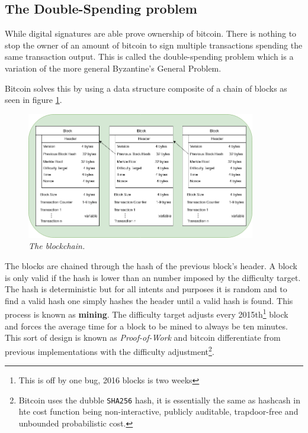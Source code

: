 \subsection{The Double-Spending problem}

While digital signatures are able prove ownership of bitcoin. There is nothing to stop the owner of an amount of bitcoin to sign multiple transactions spending the same transaction output. This is called the double-spending problem which is a variation of the more general Byzantine's General Problem.

Bitcoin solves this by using a data structure composite of a chain of blocks as seen in figure \ref{fig:blockchain}.

\begin{figure}[!htb]
	\hspace*{-2cm} 
	\centering
	\includegraphics[width=10cm]{blockchain.png}
	\caption{\textit{The blockchain. 
	}}
	\label{fig:blockchain}
	\hspace{2mm} 
\end{figure}

The blocks are chained through the hash of the previous block's header. A block is only valid if the hash is lower than an number imposed by the difficulty target. The hash is deterministic but for all intents and purposes it is random and to find a valid hash one simply hashes the header until a valid hash is found. This process is known as \textbf{mining}. The difficulty target adjusts every 2015th\footnote{This is off by one bug, 2016 blocks is two weeks} block\cite{repository:bitcoin} and forces the average time for a block to be mined to always be ten minutes. This sort of design is known as \textit{Proof-of-Work} and bitcoin differentiate from previous implementations with the difficulty adjustment\cite{back:hashcash}\footnote{Bitcoin uses the dubble \texttt{SHA256} hash, it is essentially the same as hashcash in hte cost function being non-interactive, publicly auditable, trapdoor-free and unbounded probabilistic cost\cite{back:hashcash}.}.


